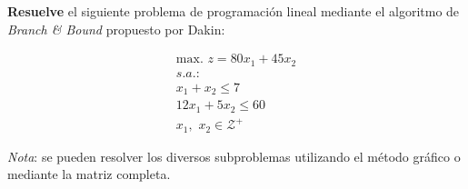 
\textbf{Resuelve} el siguiente problema de programación lineal mediante el algoritmo de \textit{Branch \& Bound} propuesto por Dakin:

\begin{equation}
\begin{split}
\mbox{max. } z = 80x_1 + 45x_2\\
s.a.:\\
x_1 + x_2 \leq  7\\
12x_1 + 5x_2 \leq 60\\
x_1,\,\,x_2 \in  \mathcal{Z}^+
\end{split}
\end{equation}

\textit{Nota}: se pueden resolver los diversos subproblemas utilizando el método gráfico o mediante la matriz completa.

